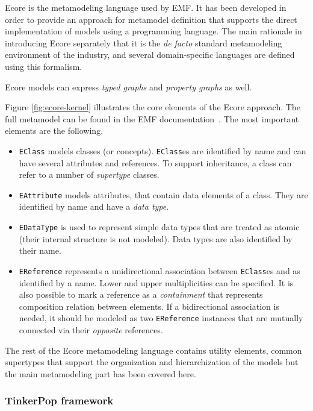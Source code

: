 Ecore is the metamodeling language used by EMF. It has been developed in order to provide an approach for metamodel definition that supports the direct implementation of models using a programming language. The main rationale in introducing Ecore separately that it is the \emph{de facto} standard metamodeling environment of the industry, and several domain-specific languages are defined using this formalism.

Ecore models can express \emph{typed graphs} and \emph{property graphs} as well.


Figure \ref{fig:ecore-kernel} illustrates the core elements of the Ecore approach. The full metamodel can be found in the EMF documentation~\cite{ecore}. The most important elements are the following.
 
\begin{itemize}
  \item \verb+EClass+ models classes (or concepts). \verb+EClass+es are identified by name and can have several attributes and references. To support inheritance, a class can refer to a number of \emph{supertype} classes.
  \item \verb+EAttribute+ models attributes, that contain data elements of a class. They are identified by name and have a \emph{data type}.
  \item \verb+EDataType+ is used to represent simple data types that are treated as atomic (their internal structure is not modeled). Data types are also identified by their name.
  \item \verb+EReference+ represents a unidirectional association between \verb+EClass+es and as identified by a name. Lower and upper multiplicities can be specified. It is also possible to mark a reference as a \emph{containment} that represents composition relation between elements. If a bidirectional association is needed, it should be modeled as two \verb+EReference+ instances that are mutually connected via their \emph{opposite} references.
\end{itemize}

The rest of the Ecore metamodeling language contains utility elements, common supertypes that support the organization and hierarchization of the models but the main metamodeling part has been covered here.

\subsubsection{TinkerPop framework}

